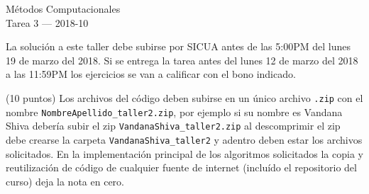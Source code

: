 \documentclass[11pt,letterpaper]{exam}
\begin{document}
\begin{center}
{\Large Métodos Computacionales} \\
Tarea 3 --- 2018-10\\

\end{center}


\vspace{0.3cm}

\noindent
La solución a este taller debe subirse por SICUA antes de las 5:00PM
del lunes 19 de marzo del 2018. 
Si se entrega la tarea antes del lunes 12 de marzo del 2018 a las
11:59PM los ejercicios se van a calificar con el bono indicado. 
\noindent

\vspace{0.3cm}
(10 puntos) Los archivos del c\'odigo  deben subirse en un
\'unico archivo \verb".zip" con el nombre
\verb"NombreApellido_taller2.zip", por ejemplo si su nombre es Vandana
Shiva deber\'ia subir el zip
\verb"VandanaShiva_taller2.zip" al descomprimir el zip debe crearse la
carpeta \verb"VandanaShiva_taller2" y adentro deben estar los archivos
solicitados. 
En la implementaci\'on principal de los algoritmos solicitados la
copia y reutilizaci\'on de c\'odigo de cualquier fuente de internet
(inclu\'ido el repositorio del curso) deja la nota en cero.  
\end{document}
